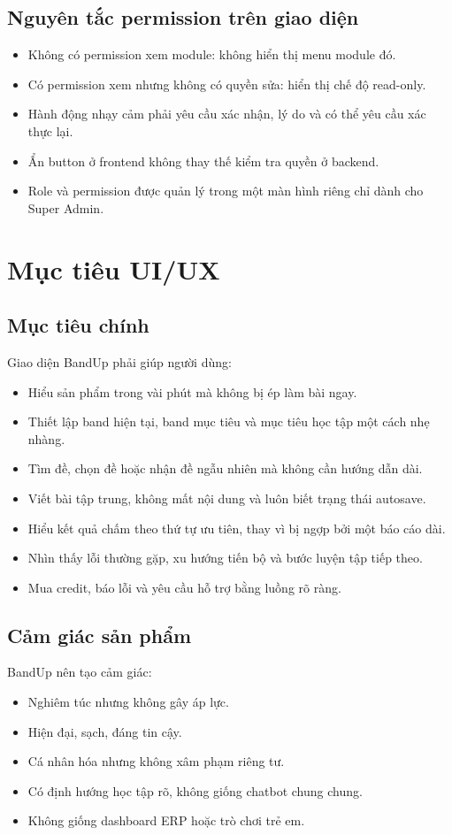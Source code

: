 \documentclass[11pt,a4paper]{article}
\begin{document}
\subsection{Nguyên tắc permission trên giao diện}
\begin{itemize}
  \item Không có permission xem module: không hiển thị menu module đó.
  \item Có permission xem nhưng không có quyền sửa: hiển thị chế độ read-only.
  \item Hành động nhạy cảm phải yêu cầu xác nhận, lý do và có thể yêu cầu xác thực lại.
  \item Ẩn button ở frontend không thay thế kiểm tra quyền ở backend.
  \item Role và permission được quản lý trong một màn hình riêng chỉ dành cho Super Admin.
\end{itemize}

\section{Mục tiêu UI/UX}

\subsection{Mục tiêu chính}
Giao diện BandUp phải giúp người dùng:
\begin{itemize}
  \item Hiểu sản phẩm trong vài phút mà không bị ép làm bài ngay.
  \item Thiết lập band hiện tại, band mục tiêu và mục tiêu học tập một cách nhẹ nhàng.
  \item Tìm đề, chọn đề hoặc nhận đề ngẫu nhiên mà không cần hướng dẫn dài.
  \item Viết bài tập trung, không mất nội dung và luôn biết trạng thái autosave.
  \item Hiểu kết quả chấm theo thứ tự ưu tiên, thay vì bị ngợp bởi một báo cáo dài.
  \item Nhìn thấy lỗi thường gặp, xu hướng tiến bộ và bước luyện tập tiếp theo.
  \item Mua credit, báo lỗi và yêu cầu hỗ trợ bằng luồng rõ ràng.
\end{itemize}

\subsection{Cảm giác sản phẩm}
BandUp nên tạo cảm giác:
\begin{itemize}
  \item Nghiêm túc nhưng không gây áp lực.
  \item Hiện đại, sạch, đáng tin cậy.
  \item Cá nhân hóa nhưng không xâm phạm riêng tư.
  \item Có định hướng học tập rõ, không giống chatbot chung chung.
  \item Không giống dashboard ERP hoặc trò chơi trẻ em.
\end{itemize}
\end{document}
